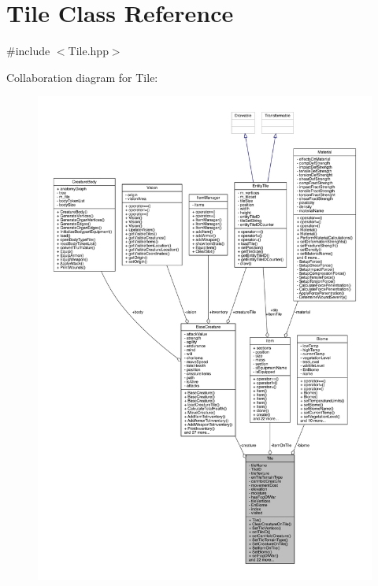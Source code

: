 \hypertarget{class_tile}{}\section{Tile Class Reference}
\label{class_tile}


{\ttfamily \#include $<$Tile.\+hpp$>$}



Collaboration diagram for Tile\+:
\nopagebreak
\begin{figure}[H]
\begin{center}
\leavevmode
\includegraphics[width=350pt]{d6/d49/class_tile__coll__graph}
\end{center}
\end{figure}
